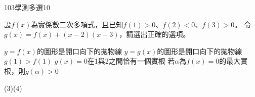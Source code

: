     \begin{QUESTION}
        \begin{ExamInfo}{103}{學測}{多選}{10}
        \end{ExamInfo}
        \begin{ExamAnsRateInfo}{53}{83}{52}{24}
        \end{ExamAnsRateInfo}
        \begin{QBODY}
            設$f(x)$為實係數二次多項式，且已知$f(1)>0$、$f(2)<0$、$f(3)>0$。
		令$g(x)=f(x)+(x-2)(x-3)$，請選出正確的選項。
		\begin{QOPS}
			\QOP $y=f(x)$的圖形是開口向下的拋物線
			\QOP $y=g(x)$的圖形是開口向下的拋物線
			\QOP $g(1)>f(1)$
			\QOP $g(x)=0$在1與2之間恰有一個實根
			\QOP 若$\alpha $為$f(x)=0$的最大實根，則$g(\alpha )>0$
		\end{QOPS}
        \end{QBODY}
        \begin{QFROMS}
        \end{QFROMS}
        \begin{QTAGS}\end{QTAGS}
        \begin{QANS}
            (3)(4)
        \end{QANS}
        \begin{QSOLLIST}
        \end{QSOLLIST}
        \begin{QEMPTYSPACE}
        \end{QEMPTYSPACE}
    \end{QUESTION}
